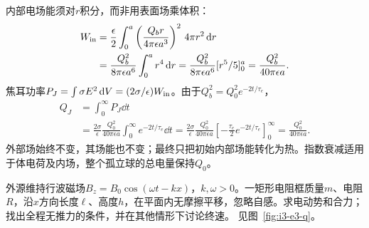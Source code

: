 \begin{solution}
内部电场能须对$r$积分，而非用表面场乘体积：
\[
\begin{aligned}
W_{\rm in}
&=\frac{\epsilon}{2}\int_0^a
\left(\frac{Q_b r}{4\pi\epsilon a^3}\right)^2\,4\pi r^2\mathop{}\!\mathrm d r\\
&=\frac{Q_b^2}{8\pi\epsilon a^6}\int_0^ar^4\mathop{}\!\mathrm d r
=\frac{Q_b^2}{8\pi\epsilon a^6}[r^5/5]_0^a
=\frac{Q_b^2}{40\pi\epsilon a}.
\end{aligned}
\]
焦耳功率$P_J=\int\sigma E^2\mathop{}\!\mathrm d V=(2\sigma/\epsilon)W_{\rm in}$。由于$Q_b^2=Q_0^2e^{-2t/\tau_e}$，
\[
\begin{aligned}
Q_J&=\int_0^\infty P_J\dd t\\
&=\frac{2\sigma}{\epsilon}\frac{Q_0^2}{40\pi\epsilon a}
\int_0^\infty e^{-2t/\tau_e}\dd t
=\frac{2\sigma}{\epsilon}\frac{Q_0^2}{40\pi\epsilon a}
\left[-\frac{\tau_e}{2}e^{-2t/\tau_e}\right]_0^\infty
=\boxed{\frac{Q_0^2}{40\pi\epsilon a}}.
\end{aligned}
\]
外部场始终不变，其场能也不变；最终只把初始内部场能转化为热。指数衰减适用于体电荷及内场，整个孤立球的总电量保持$Q_0$。
\end{solution}

\begin{example}[行波磁场拖动电阻线框]\label{ex:i3-e3}
外源维持行波磁场$B_z=B_0\cos(\omega t-kx)$，$k,\omega>0$。一矩形电阻框质量$m$、电阻$R$，沿$x$方向长度$\ell$、高度$h$，在平面内无摩擦平移，忽略自感。求电动势和合力；找出全程无推力的条件，并在其他情形下讨论终速。 见图~\ref{fig:i3-e3-q}。
\end{example}

